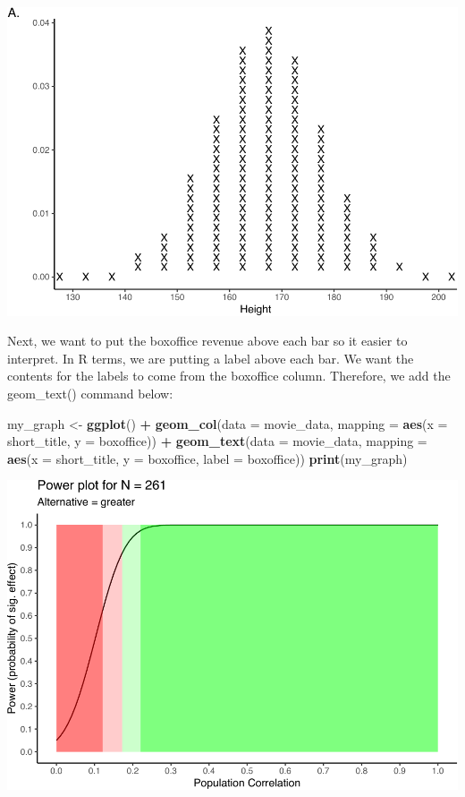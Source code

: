 \documentclass[
]{krantz}
\makeatletter
\newenvironment{Shaded}{\begin{snugshade}}{\end{snugshade}}
\newcommand{\DataTypeTok}[1]{\textcolor[rgb]{0.27,0.27,0.27}{#1}}
\newcommand{\KeywordTok}[1]{\textcolor[rgb]{0.27,0.27,0.27}{\textbf{#1}}}
\newcommand{\NormalTok}[1]{#1}
\newcommand{\OperatorTok}[1]{\textcolor[rgb]{0.43,0.43,0.43}{\textbf{#1}}}
\newcommand{\StringTok}[1]{\textcolor[rgb]{0.5,0.5,0.5}{#1}}
\newenvironment{kframe}{%
\medskip{}
\setlength{\fboxsep}{.8em}
 \def\at@end@of@kframe{}%
 \ifinner\ifhmode%
  \def\at@end@of@kframe{\end{minipage}}%
  \begin{minipage}{\columnwidth}%
 \fi\fi%
 \def\FrameCommand##1{\hskip\@totalleftmargin \hskip-\fboxsep
 \colorbox{shadecolor}{##1}\hskip-\fboxsep
     \hskip-\linewidth \hskip-\@totalleftmargin \hskip\columnwidth}%
 \MakeFramed {\advance\hsize-\width
   \@totalleftmargin\z@ \linewidth\hsize
   \@setminipage}}%
 {\par\unskip\endMakeFramed%
 \at@end@of@kframe}
\renewenvironment{Shaded}{\begin{kframe}}{\end{kframe}}
\makeatother
\begin{document}
\includegraphics[width=0.65\linewidth]{bookdown_files/figure-latex/unnamed-chunk-261-1}

Next, we want to put the boxoffice revenue above each bar so it easier to interpret. In R terms, we are putting a label above each bar. We want the contents for the labels to come from the boxoffice column. Therefore, we add the geom\_text() command below:

\begin{Shaded}
\begin{Highlighting}[]
\NormalTok{my_graph <-}\StringTok{ }\KeywordTok{ggplot}\NormalTok{() }\OperatorTok{+}
\StringTok{  }\KeywordTok{geom_col}\NormalTok{(}\DataTypeTok{data =}\NormalTok{ movie_data,}
           \DataTypeTok{mapping =} \KeywordTok{aes}\NormalTok{(}\DataTypeTok{x =}\NormalTok{ short_title, }
                         \DataTypeTok{y =}\NormalTok{ boxoffice)) }\OperatorTok{+}
\StringTok{  }\KeywordTok{geom_text}\NormalTok{(}\DataTypeTok{data =}\NormalTok{ movie_data, }
           \DataTypeTok{mapping =} \KeywordTok{aes}\NormalTok{(}\DataTypeTok{x =}\NormalTok{ short_title, }
                         \DataTypeTok{y =}\NormalTok{ boxoffice, }
                         \DataTypeTok{label =}\NormalTok{ boxoffice))}
\KeywordTok{print}\NormalTok{(my_graph)}
\end{Highlighting}
\end{Shaded}

\includegraphics[width=0.65\linewidth]{bookdown_files/figure-latex/unnamed-chunk-262-1}
\end{document}
